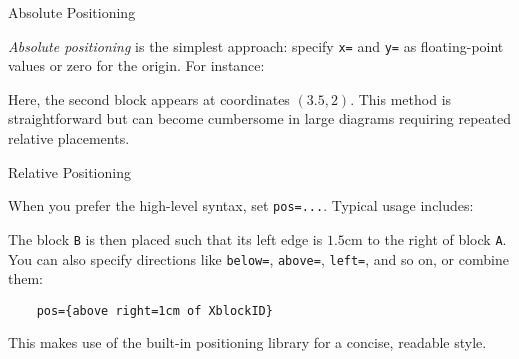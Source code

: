 \documentclass[show-experimental]{l3doc}
\begin{document}
\begin{variable}{Absolute Positioning}
	\begin{syntax}
	\end{syntax}
	\emph{Absolute positioning} is the simplest approach: specify \verb|x=| and
	\verb|y=| as floating-point values or zero for the origin. For instance:
	\begin{nskusage}
		\nskBlock[
			x=0, y=0,
			text-center={First block}
		]
		\nskBlock[
			x=3.5, y=2,
			text-center={Moved block}
		]
	\end{nskusage}

	Here, the second block appears at coordinates \((3.5, 2)\). This method is
	straightforward but can become cumbersome in large diagrams requiring repeated
	relative placements.
\end{variable}

\begin{variable}{Relative Positioning}
	\begin{syntax}
		\oarg{pos=\meta{<anchor spec>}}
	\end{syntax}
	When you prefer the high-level   syntax, set
	\verb|pos=...|. Typical usage includes:
	\begin{nskusage}
		\nskBlock[
			id=A,
			text-center={Reference}
		]
		\nskBlock[
			id=B,
			pos={right=1.5cm of A},
			text-center={Relative}
		]
	\end{nskusage}

	The block \texttt{B} is then placed such that its left edge is \(1.5\)cm
	to the right of block \texttt{A}. You can also specify directions like
	\verb|below=|, \verb|above=|, \verb|left=|, and so on, or combine them:

	\begin{lstlisting}
    pos={above right=1cm of XblockID}
  \end{lstlisting}
	This makes use of the built-in  positioning library for a concise,
	readable style.
\end{variable}
\end{document}

